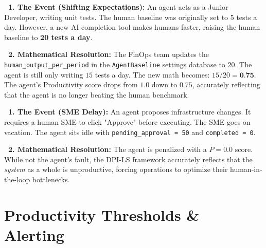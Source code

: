 \documentclass[11pt,a4paper]{article}
\begin{document}
\vspace{0.5cm}
\begin{tcolorbox}[enhanced, colback=dpicloud!10!white, colframe=dpicloud, title={\textbf{\faUsers\ Scenario 3: Human Override on Baseline}}, fonttitle=\bfseries, boxrule=1pt, arc=2mm, drop shadow]
\textbf{\color{dpicloud}\faClock\ 1. The Event (Shifting Expectations):} 
An agent acts as a Junior Developer, writing unit tests. The human baseline was originally set to 5 tests a day. However, a new AI completion tool makes humans faster, raising the human baseline to \textbf{20 tests a day}.

\vspace{0.2cm}
\textbf{\color{dpigreen}\faCalculator\ 2. Mathematical Resolution:}
The FinOps team updates the \texttt{human\_output\_per\_period} in the \texttt{AgentBaseline} settings database to $20$. The agent is still only writing $15$ tests a day. 
The new math becomes: $15 / 20 = \textbf{0.75}$.
The agent's Productivity score drops from $1.0$ down to $0.75$, accurately reflecting that the agent is no longer beating the human benchmark.
\end{tcolorbox}

\vspace{0.5cm}
\begin{tcolorbox}[enhanced, colback=dpiteal!10!white, colframe=dpiteal, title={\textbf{\faStopwatch\ Scenario 4: Pending Approval Purgatory}}, fonttitle=\bfseries, boxrule=1pt, arc=2mm, drop shadow]
\textbf{\color{dpiteal}\faHourglassHalf\ 1. The Event (SME Delay):} 
An agent proposes infrastructure changes. It requires a human SME to click "Approve" before executing. The SME goes on vacation. The agent sits idle with \texttt{pending\_approval = 50} and \texttt{completed = 0}.

\vspace{0.2cm}
\textbf{\color{dpigreen}\faCalculator\ 2. Mathematical Resolution:}
The agent is penalized with a $P = 0.0$ score. While not the agent's fault, the DPI-LS framework accurately reflects that the \textit{system} as a whole is unproductive, forcing operations to optimize their human-in-the-loop bottlenecks.
\end{tcolorbox}

\vspace{0.5cm}

\section{Productivity Thresholds \& Alerting}
\end{document}

